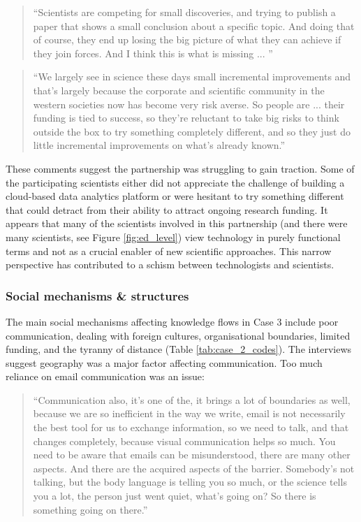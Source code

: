 \begin{quote}
\small
\enquote{Scientists are competing for small discoveries, and trying to publish a paper that shows a small conclusion about a specific topic. And doing that of course, they end up losing the big picture of what they can achieve if they join forces. And I think this is what is missing ... } \\
\end{quote}

\begin{quote}
\small
\enquote{We largely see in science these days small incremental improvements and that's largely because the corporate and scientific community in the western societies now has become very risk averse. So people are ... their funding is tied to success, so they're reluctant to take big risks to think outside the box to try something completely different, and so they just do little incremental improvements on what's already known.} \\
\end{quote}

These comments suggest the partnership was struggling to gain traction. Some of the participating scientists either did not appreciate the challenge of building a cloud-based data analytics platform or were hesitant to try something different that could detract from their ability to attract ongoing research funding. It appears that many of the scientists involved in this partnership (and there were many scientists, see Figure \ref{fig:ed_level}) view technology in purely functional terms and not as a crucial enabler of new scientific approaches. This narrow perspective has contributed to a schism between technologists and scientists.

\subsubsection{Social mechanisms \& structures}

The main social mechanisms affecting knowledge flows in Case 3 include poor communication, dealing with foreign cultures, organisational boundaries, limited funding, and the tyranny of distance (Table \ref{tab:case_2_codes}). The interviews suggest geography was a major factor affecting communication. Too much reliance on email communication was an issue:

\begin{quote}
\small
\enquote{Communication also, it's one of the, it brings a lot of boundaries as well, because we are so inefficient in the way we write, email is not necessarily the best tool for us to exchange information, so we need to talk, and that changes completely, because visual communication helps so much. You need to be aware that emails can be misunderstood, there are many other aspects. And there are the acquired aspects of the barrier. Somebody's not talking, but the body language is telling you so much, or the science tells you a lot, the person just went quiet, what's going on? So there is something going on there.} \\
\end{quote}

